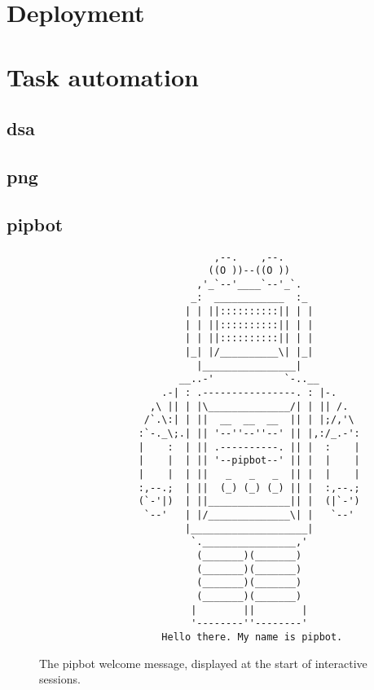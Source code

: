 
\section{Deployment}



\section{Task automation}


\subsection{dsa}


\subsection{png}


\newpage
\subsection{pipbot}\label{sec:pipbot}


\begin{figure}[H]
\begin{verbatim}
                              ,--.    ,--.
                             ((O ))--((O ))
                           ,'_`--'____`--'_`.
                          _:  ____________  :_
                         | | ||::::::::::|| | |
                         | | ||::::::::::|| | |
                         | | ||::::::::::|| | |
                         |_| |/__________\| |_|
                           |________________|
                        __..-'            `-..__
                     .-| : .----------------. : |-.
                   ,\ || | |\______________/| | || /.
                  /`.\:| | ||  __  __  __  || | |;/,'\
                 :`-._\;.| || '--''--''--' || |,:/_.-':
                 |    :  | || .----------. || |  :    |
                 |    |  | || '--pipbot--' || |  |    |
                 |    |  | ||   _   _   _  || |  |    |
                 :,--.;  | ||  (_) (_) (_) || |  :,--.;
                 (`-'|)  | ||______________|| |  (|`-')
                  `--'   | |/______________\| |   `--'
                         |____________________|
                          `.________________,'
                           (_______)(_______)
                           (_______)(_______)
                           (_______)(_______)
                           (_______)(_______)
                          |        ||        |
                          '--------''--------'
                     Hello there. My name is pipbot.
\end{verbatim}
\caption[The pipbot welcome message]
  {The pipbot welcome message, displayed at the start of interactive sessions.}
\label{fig:pipbot-logo}
\end{figure}


